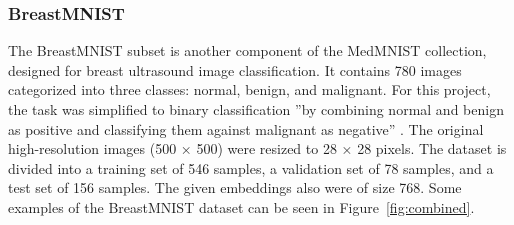 \documentclass[a4paper]{article}
\begin{document}
\subsubsection{BreastMNIST}\label{breastmnist}
The BreastMNIST subset is another component of the MedMNIST collection, designed for breast ultrasound image classification. It contains 780 images categorized into three classes: normal, benign, and malignant. For this project, the task was simplified to binary classification ''by combining normal and benign as positive and classifying them against malignant as negative'' \citep{medmnistv1, medmnistv2}. The original high-resolution images (500 × 500) were resized to 28 × 28 pixels. The dataset is divided into a training set of 546 samples, a validation set of 78 samples, and a test set of 156 samples. The given embeddings also were of size 768. Some examples of the BreastMNIST dataset can be seen in Figure~\ref{fig:combined}.
\end{document}
